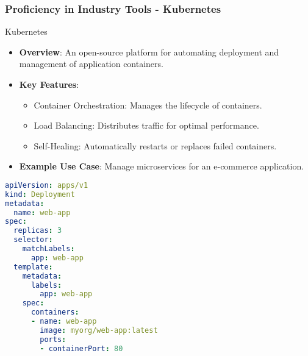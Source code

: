 \documentclass[aspectratio=169]{beamer}
\begin{document}
\begin{frame}[fragile]
    \frametitle{Proficiency in Industry Tools - Kubernetes}
    \begin{block}{Kubernetes}
        \begin{itemize}
            \item \textbf{Overview}: An open-source platform for automating deployment and management of application containers.
            \item \textbf{Key Features}:
            \begin{itemize}
                \item Container Orchestration: Manages the lifecycle of containers.
                \item Load Balancing: Distributes traffic for optimal performance.
                \item Self-Healing: Automatically restarts or replaces failed containers.
            \end{itemize}
            \item \textbf{Example Use Case}: Manage microservices for an e-commerce application.
        \end{itemize}
    \end{block}
    \begin{lstlisting}[language=yaml, caption=Sample Kubernetes Deployment YAML]
apiVersion: apps/v1
kind: Deployment
metadata:
  name: web-app
spec:
  replicas: 3
  selector:
    matchLabels:
      app: web-app
  template:
    metadata:
      labels:
        app: web-app
    spec:
      containers:
      - name: web-app
        image: myorg/web-app:latest
        ports:
        - containerPort: 80
    \end{lstlisting}
\end{frame}
\end{document}
